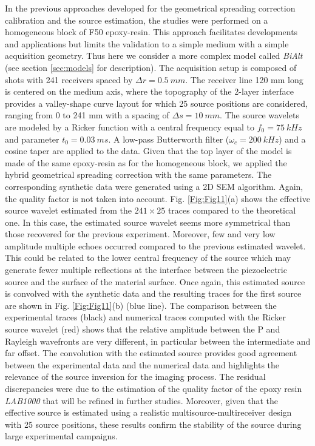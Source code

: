 \documentclass[extra,mreferee]{gji}
\newcommand{\bialt}{\textit{BiAlt} }
\begin{document}
In the previous approaches developed for the geometrical spreading correction calibration and the source estimation, the studies were performed on a homogeneous block of F50 epoxy-resin. This approach facilitates developments and applications but limits the validation to a simple medium with a simple acquisition geometry. Thus here we consider a more complex model called \bialt (see section \ref{sec:models} for description). The acquisition setup is composed of shots with 241 receivers spaced by $\Delta r=0.5\ mm$. The receiver line 120 mm long is centered on the medium axis, where the topography of the 2-layer interface provides a valley-shape curve layout for which 25 source positions are considered, ranging from 0 to 241 mm with a spacing of $\Delta s=10\ mm$. The source wavelets are modeled by a Ricker function with a central frequency equal to $f_{0}=75\ kHz$ and parameter $t_{0}=0.03\ ms$. A low-pass Butterworth filter ($\omega_{c}=200\ kHz$) and a cosine taper are applied to the data. Given that the top layer of the model is made of the same epoxy-resin as for the homogeneous block, we applied the hybrid geometrical spreading correction with the same parameters. The corresponding synthetic data were generated using a 2D SEM algorithm. Again, the quality factor is not taken into account. Fig. \ref{Fig:Fig11}(a) shows the effective source wavelet estimated from the $241 \times 25$ traces compared to the theoretical one. In this case, the estimated source wavelet seems more symmetrical than those recovered for the previous experiment. Moreover, few and very low amplitude multiple echoes occurred compared to the previous estimated wavelet. This could be related to the lower central frequency of the source which may generate fewer multiple reflections at the interface between the piezoelectric source and the surface of the material surface. Once again, this estimated source is convolved with the synthetic data and the resulting traces for the first source are shown in Fig. \ref{Fig:Fig11}(b) (blue line). The comparison between the experimental traces (black) and numerical traces computed with the Ricker source wavelet (red) shows that the relative amplitude between the P and Rayleigh wavefronts are very different, in particular between the intermediate and far offset. The convolution with the estimated source provides good agreement between the experimental data and the numerical data and highlights the relevance of the source inversion for the imaging process. The residual discrepancies were due to the estimation of the quality factor of the epoxy resin \textit{LAB1000} that will be refined in further studies. Moreover, given that the effective source is estimated using a realistic multisource-multireceiver design with 25 source positions, these results confirm the stability of the source during large experimental campaigns. 
\end{document}
